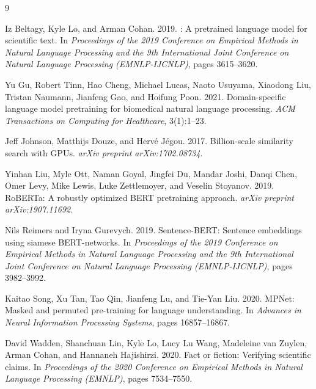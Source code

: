 \documentclass[11pt]{article}
\begin{document}
\begin{thebibliography}{9}

Iz Beltagy, Kyle Lo, and Arman Cohan. 2019.
: A pretrained language model for scientific text.
\newblock In \textit{Proceedings of the 2019 Conference on Empirical Methods in Natural Language Processing and the 9th International Joint Conference on Natural Language Processing (EMNLP-IJCNLP)}, pages 3615--3620.

Yu Gu, Robert Tinn, Hao Cheng, Michael Lucas, Naoto Usuyama, Xiaodong Liu, Tristan Naumann, Jianfeng Gao, and Hoifung Poon. 2021.
\newblock Domain-specific language model pretraining for biomedical natural language processing.
\newblock \textit{ACM Transactions on Computing for Healthcare}, 3(1):1--23.

Jeff Johnson, Matthijs Douze, and Herv\'{e} J\'{e}gou. 2017.
\newblock Billion-scale similarity search with GPUs.
\newblock \textit{arXiv preprint arXiv:1702.08734}.

Yinhan Liu, Myle Ott, Naman Goyal, Jingfei Du, Mandar Joshi, Danqi Chen, Omer Levy, Mike Lewis, Luke Zettlemoyer, and Veselin Stoyanov. 2019.
\newblock RoBERTa: A robustly optimized {BERT} pretraining approach.
\newblock \textit{arXiv preprint arXiv:1907.11692}.

Nils Reimers and Iryna Gurevych. 2019.
\newblock Sentence-BERT: Sentence embeddings using siamese {BERT}-networks.
\newblock In \textit{Proceedings of the 2019 Conference on Empirical Methods in Natural Language Processing and the 9th International Joint Conference on Natural Language Processing (EMNLP-IJCNLP)}, pages 3982--3992.

Kaitao Song, Xu Tan, Tao Qin, Jianfeng Lu, and Tie-Yan Liu. 2020.
\newblock MPNet: Masked and permuted pre-training for language understanding.
\newblock In \textit{Advances in Neural Information Processing Systems}, pages 16857--16867.

David Wadden, Shanchuan Lin, Kyle Lo, Lucy Lu Wang, Madeleine van Zuylen, Arman Cohan, and Hannaneh Hajishirzi. 2020.
\newblock Fact or fiction: Verifying scientific claims.
\newblock In \textit{Proceedings of the 2020 Conference on Empirical Methods in Natural Language Processing (EMNLP)}, pages 7534--7550.

\end{thebibliography}
\end{document}
